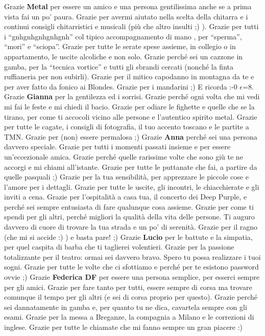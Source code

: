 \documentclass[10pt]{amsart}
\newcommand{\n}[1]{{\Large \bf #1}}
\begin{document}
Grazie \n{Metal} per essere un amico e una persona gentilissima anche se a prima vista fai un po' paura. Grazie per avermi aiutato nella scelta della chitarra e i continui consigli chitarristici e musicali (più che altro insulti ;) ). Grazie per tutti i ``gnhgnhgnhgnhgnh''  col tipico accompagnamento di mano , per ``sperma'', ``mori'' e ``sciopa''. Grazie per tutte le serate spese assieme, in collegio o in appartamento, le uscite alcoliche e non solo. Grazie perché sei un cazzone in gamba, per la ``tecnica vortice'' e tutti gli sbrandi cercati (nonché la finta ruffianeria per non subirli).  Grazie per il mitico capodanno in montagna da te e per aver fatto da fonico ai Blondes. Grazie per i mandarini ;) E ricorda :-0 $\epsilon$=8.
Grazie \n{Gianna} per la gentilezza ed i sorrisi. Grazie perché ogni volta che mi vedi mi fai le feste e mi chiedi il bacio. Grazie per odiare le fighette e quelle che se la tirano, per come ti accocoli vicino alle persone e l'autentico spirito metal. Grazie per tutte le cagate, i consigli di fotografia, il tuo accento toscano e le partite a TMN. Grazie per (non) essere permalosa ;)
Grazie \n{Anna} perché sei una persona davvero speciale. Grazie per tutti i momenti passati insieme e per essere un'eccezionale amica. Grazie perché quelle rarissime volte che sono giù te ne accorgi e mi chiami all'istante. Grazie per tutte le puttanate che fai, a partire da quelle pasquali ;) Grazie per la tua sensibilità, per apprezzare le piccole cose e l'amore per i dettagli. Grazie per tutte le uscite, gli incontri, le chiacchierate e gli inviti a cena. Grazie per l'ospitalità a casa tua, il concerto dei Deep Purple, e perché sei sempre entusiasta di fare qualunque cosa assieme. Grazie per come ti spendi per gli altri, perché migliori la qualità della vita delle persone. Ti auguro davvero di cuore di trovare la tua strada e un po' di serenità. Grazie per il ragno (che mi si accide :) ) e basta pare! ;) 
Grazie \n{Lucio} per le battute e la simpatia, per quel caspita di barba che ti taglierei volentieri. Grazie per la passione totalizzante per il teatro: ormai sei davvero bravo. Spero tu possa realizzare i tuoi sogni. Grazie per tutte le volte che ci sfottiamo e perché per te esistono password ovvie ;) 
Grazie \n{Federica DF} per essere una persona semplice, per esserci sempre per gli amici. Grazie per fare tanto per tutti, essere sempre di corsa ma trovare comunque il tempo per gli altri (e sei di corsa proprio per questo). Grazie perché sei dannatamente in gamba e, per quanto tu ne dica, cavartela sempre con gli esami. Grazie per la messa a Breganze, la compagnia a Milano e le correzioni di inglese. Grazie per tutte le chiamate che mi fanno sempre un gran piacere :)
\end{document}
